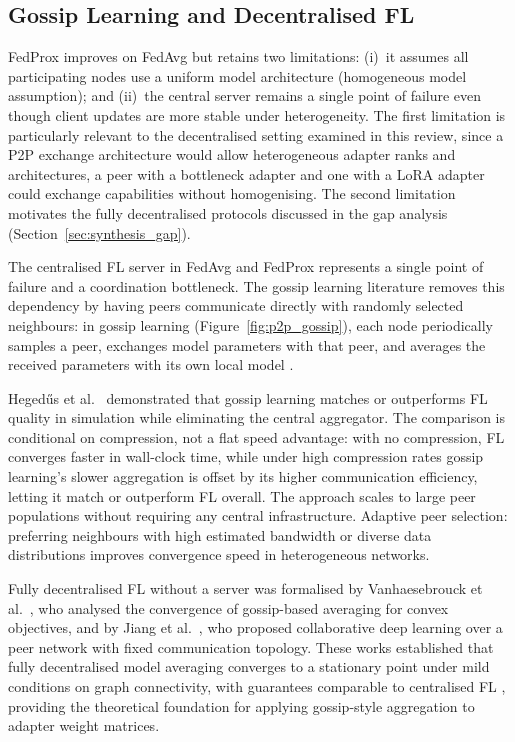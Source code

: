 \subsection{Gossip Learning and Decentralised FL}
\label{sec:p2p_federated:gossip}

FedProx improves on FedAvg but retains two limitations: (i)~it assumes all participating nodes use 
a uniform model architecture (homogeneous model assumption); and (ii)~the central server remains 
a single point of failure even though client updates are more stable under heterogeneity. 
The first limitation is particularly relevant to the decentralised setting examined in this review, 
since a P2P exchange architecture would allow heterogeneous adapter ranks and architectures, a peer with a bottleneck adapter and one with a LoRA adapter could exchange capabilities without homogenising. 
The second limitation motivates the fully decentralised protocols discussed in the gap analysis (Section~\ref{sec:synthesis_gap}).

The centralised FL server in FedAvg and FedProx represents a single point of failure and
a coordination bottleneck. The gossip learning literature removes this dependency by
having peers communicate directly with randomly selected neighbours: in gossip learning
(Figure~\ref{fig:p2p_gossip}),
each node periodically samples a peer, exchanges model parameters with that peer, and
averages the received parameters with its own local model \cite{OrmandyGossip2013}.

Heged{\H{u}}s et al.~\cite{HegeduisGossip2019} demonstrated that gossip learning matches or outperforms
FL quality in simulation while eliminating the central aggregator. The comparison is
conditional on compression, not a flat speed advantage: with no compression, FL
converges faster in wall-clock time, while under high compression rates gossip
learning's slower aggregation is offset by its higher communication efficiency,
letting it match or outperform FL overall. The approach scales to large peer
populations without requiring any central infrastructure. Adaptive peer selection:
preferring neighbours with high estimated bandwidth or diverse data distributions
improves convergence speed in heterogeneous networks.

Fully decentralised FL without a server was formalised by Vanhaesebrouck et al.~\cite{VanhaesebrouckDCL2017},
who analysed the convergence of gossip-based averaging for convex objectives, and by
Jiang et al.~\cite{JiangCollab2017}, who proposed collaborative deep learning over a peer network
with fixed communication topology. These works established that fully decentralised
model averaging converges to a stationary point under mild conditions on
graph connectivity, with guarantees comparable to centralised FL
\cite{Lian2017Decentralized}, providing the theoretical foundation for applying
gossip-style aggregation to adapter weight matrices.

